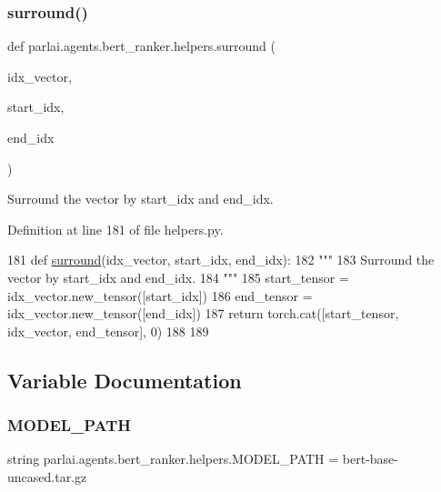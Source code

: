 \subsubsection{\texorpdfstring{surround()}{surround()}}
{\footnotesize\ttfamily def parlai.\+agents.\+bert\+\_\+ranker.\+helpers.\+surround (\begin{DoxyParamCaption}\item[{}]{idx\+\_\+vector,  }\item[{}]{start\+\_\+idx,  }\item[{}]{end\+\_\+idx }\end{DoxyParamCaption})}

\begin{DoxyVerb}Surround the vector by start_idx and end_idx.
\end{DoxyVerb}
 

Definition at line 181 of file helpers.\+py.


\begin{DoxyCode}
181 \textcolor{keyword}{def }\hyperlink{namespaceparlai_1_1agents_1_1bert__ranker_1_1helpers_ae5621255d8851c9628c116cb6db4c28c}{surround}(idx\_vector, start\_idx, end\_idx):
182     \textcolor{stringliteral}{"""}
183 \textcolor{stringliteral}{    Surround the vector by start\_idx and end\_idx.}
184 \textcolor{stringliteral}{    """}
185     start\_tensor = idx\_vector.new\_tensor([start\_idx])
186     end\_tensor = idx\_vector.new\_tensor([end\_idx])
187     \textcolor{keywordflow}{return} torch.cat([start\_tensor, idx\_vector, end\_tensor], 0)
188 
189 
\end{DoxyCode}


\subsection{Variable Documentation}
\mbox{\label{namespaceparlai_1_1agents_1_1bert__ranker_1_1helpers_a596044b27f3659ebe25c250dca2f15f7}} 
\subsubsection{\texorpdfstring{M\+O\+D\+E\+L\+\_\+\+P\+A\+TH}{MODEL\_PATH}}
{\footnotesize\ttfamily string parlai.\+agents.\+bert\+\_\+ranker.\+helpers.\+M\+O\+D\+E\+L\+\_\+\+P\+A\+TH = \textquotesingle{}bert-\/base-\/uncased.\+tar.\+gz\textquotesingle{}}



